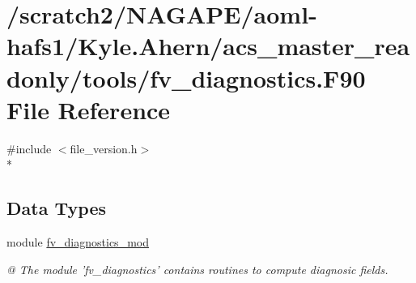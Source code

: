 \section{/scratch2/\-N\-A\-G\-A\-P\-E/aoml-\/hafs1/\-Kyle.Ahern/acs\-\_\-master\-\_\-readonly/tools/fv\-\_\-diagnostics.F90 File Reference}
\label{fv__diagnostics_8F90}
{\ttfamily \#include $<$file\-\_\-version.\-h$>$}\\*
\subsection*{Data Types}
\begin{DoxyCompactItemize}
\item 
module \hyperlink{classfv__diagnostics__mod}{fv\-\_\-diagnostics\-\_\-mod}
\begin{DoxyCompactList}\small\item\em @ The module 'fv\-\_\-diagnostics' contains routines to compute diagnosic fields. \end{DoxyCompactList}\end{DoxyCompactItemize}
